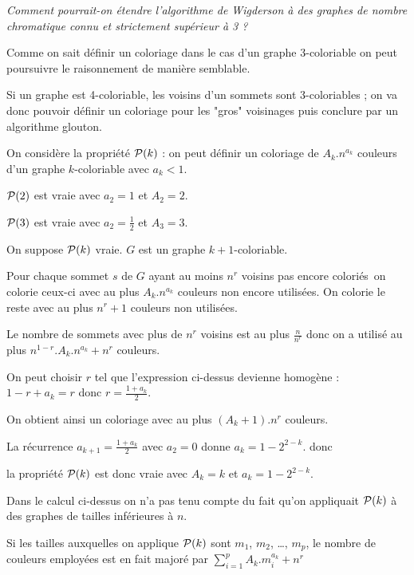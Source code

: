 \begin{Exercise}\it  
Comment pourrait-on étendre l'algorithme de Wigderson à des graphes de nombre chromatique connu et strictement supérieur à 3 ? 
\end{Exercise}  
\begin{Answer}
Comme on sait définir un coloriage dans le cas d'un graphe 3-coloriable on peut poursuivre le raisonnement de manière semblable.

Si un graphe est 4-coloriable, les voisins d'un sommets sont 3-coloriables ; on va donc pouvoir définir un coloriage pour les "gros" voisinages puis conclure par un algorithme glouton.

On considère la propriété ${\cal P}(k)$ : 
on peut définir un coloriage de $A_k.n^{a_k}$ couleurs d'un graphe $k$-coloriable avec $a_k< 1$.

${\cal P}(2)$ est vraie avec $a_2=1$ et $A_2=2$.

${\cal P}(3)$ est vraie avec $a_2=\frac 12$ et $A_3=3$.

On suppose ${\cal P}(k)$ vraie. $G$ est un graphe $k+1$-coloriable.

Pour chaque sommet $s$ de $G$ ayant au moins $n^r$ voisins pas encore coloriés on colorie ceux-ci avec au plus $A_k.n^{a_k}$ couleurs non encore utilisées. On colorie le reste avec au plus $n^r+1$ couleurs non utilisées.

Le nombre de sommets avec plus de $n^r$ voisins est au plus $\frac n{n^r}$ donc on a utilisé au plus
$n^{1-r}.A_k.n^{a_k} + n^r$ couleurs.

On peut choisir $r$ tel que l'expression ci-dessus devienne homogène : $1-r+a_k = r$ donc $r = \frac {1+a_k}2$.

On obtient ainsi un coloriage avec au plus $(A_k+1).n^r$ couleurs.

La récurrence $a_{k+1} = \frac {1+a_k}2$ avec $a_2=0$ donne $a_k=1- 2^{2-k}$. donc 

la propriété ${\cal P}(k)$ est donc vraie avec $A_k=k$ et $a_k = 1- 2^{2-k}$.

\medskip

Dans le calcul ci-dessus on n'a pas tenu compte du fait qu'on appliquait ${\cal P}(k)$ à des graphes de tailles inférieures à $n$. 

Si les tailles auxquelles on applique ${\cal P}(k)$ sont $m_1$, $m_2$, \dots, $m_p$, le nombre de couleurs employées est en fait majoré par
$\displaystyle \sum_{i=1}^p A_k.m_i^{a_k}+n^r$


\end{Answer}
